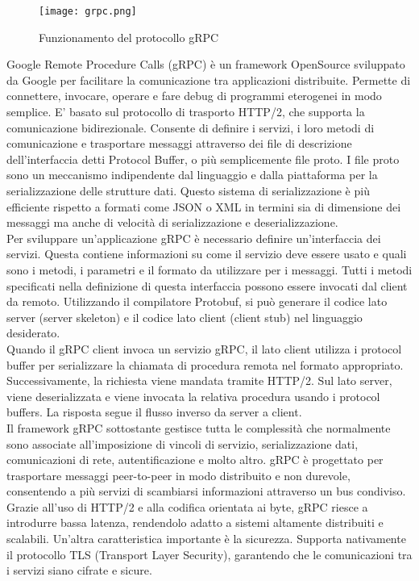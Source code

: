 \begin{figure}[h]
    \centering
   \texttt{[image: grpc.png]}
    \caption{Funzionamento del protocollo gRPC}
    \label{fig:grpc}
\end{figure}
Google Remote Procedure Calls (gRPC\cite{grpc}) è un framework OpenSource sviluppato da Google per facilitare la comunicazione tra applicazioni distribuite. Permette di
connettere, invocare, operare e fare debug di programmi eterogenei in modo semplice.
E' basato sul protocollo di trasporto HTTP/2, che supporta la comunicazione bidirezionale. 
Consente di definire i servizi, i loro metodi di comunicazione e trasportare messaggi attraverso dei file di descrizione dell'interfaccia detti Protocol Buffer, o più semplicemente file proto.
I file proto sono un meccanismo indipendente dal linguaggio e dalla piattaforma per la serializzazione delle strutture dati. Questo sistema di serializzazione è più efficiente rispetto a formati come JSON o XML
in termini sia di dimensione dei messaggi ma anche di velocità di serializzazione e deserializzazione.
\\Per sviluppare un'applicazione gRPC è necessario definire un'interfaccia dei servizi. Questa contiene informazioni su come il servizio deve essere usato e quali sono i metodi, i parametri e 
il formato da utilizzare per i messaggi. Tutti i metodi specificati nella definizione di questa interfaccia possono essere invocati dal client da remoto.
Utilizzando il compilatore Protobuf, si può generare il codice lato server (server skeleton) e il codice lato client (client stub) nel linguaggio desiderato.
\\Quando il gRPC client invoca un servizio gRPC, il lato client utilizza i protocol buffer per serializzare la chiamata di procedura remota nel formato appropriato. 
Successivamente, la richiesta viene mandata tramite HTTP/2. Sul lato server, viene deserializzata e viene invocata la relativa procedura usando i protocol buffers.
La risposta segue il flusso inverso da server a client.
\\Il framework gRPC sottostante gestisce tutta le complessità che normalmente sono associate all'imposizione di vincoli di servizio, serializzazione dati, comunicazioni di rete, autentificazione e molto altro.
gRPC è progettato per trasportare messaggi peer-to-peer in modo distribuito e non durevole, consentendo a più servizi di scambiarsi informazioni attraverso un bus condiviso.
Grazie all'uso di HTTP/2 e alla codifica orientata ai byte, gRPC riesce a introdurre bassa latenza, rendendolo adatto a sistemi altamente distribuiti e scalabili. 
Un'altra caratteristica importante è la sicurezza. Supporta nativamente il protocollo TLS (Transport Layer Security), garantendo che le comunicazioni tra i servizi siano cifrate e sicure.


